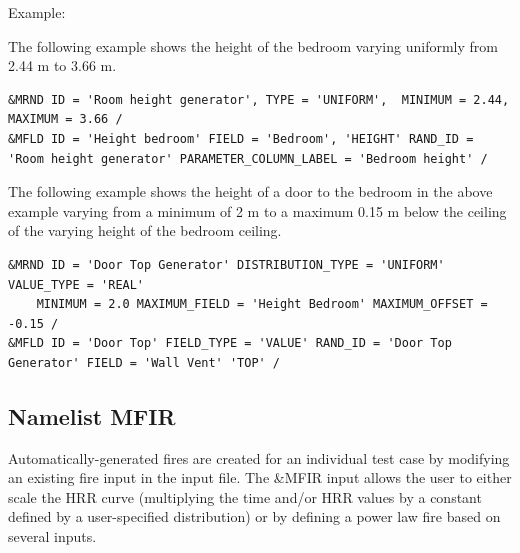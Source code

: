 \documentclass[12pt,twoside]{book}
\begin{document}
\vspace{\baselineskip}
\noindent Example:

The following example shows the height of the bedroom varying uniformly from 2.44 m to 3.66 m.
\begin{lstlisting}
&MRND ID = 'Room height generator', TYPE = 'UNIFORM',  MINIMUM = 2.44, MAXIMUM = 3.66 /
&MFLD ID = 'Height bedroom' FIELD = 'Bedroom', 'HEIGHT' RAND_ID = 'Room height generator' PARAMETER_COLUMN_LABEL = 'Bedroom height' /
\end{lstlisting}

The following example shows the height of a door to the bedroom in the above example varying from a minimum of 2 m to a maximum 0.15 m below the ceiling of the varying height of the bedroom ceiling.

\begin{lstlisting}
&MRND ID = 'Door Top Generator' DISTRIBUTION_TYPE = 'UNIFORM' VALUE_TYPE = 'REAL'
    MINIMUM = 2.0 MAXIMUM_FIELD = 'Height Bedroom' MAXIMUM_OFFSET = -0.15 /
&MFLD ID = 'Door Top' FIELD_TYPE = 'VALUE' RAND_ID = 'Door Top Generator' FIELD = 'Wall Vent' 'TOP' /
\end{lstlisting}


\clearpage

\subsection{Namelist MFIR}

Automatically-generated fires are created for an individual test case by modifying an existing fire input in the input file. The {\ct \&MFIR} input allows the user to either scale the HRR curve (multiplying the time and/or HRR values by a constant defined by a user-specified distribution) or by defining a power law fire based on several inputs.
\end{document}
